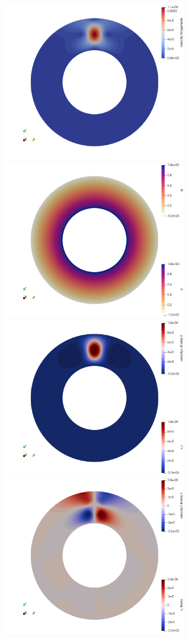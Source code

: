 \begin{center}
\includegraphics[width=8cm]{python_codes/fieldstone_152/results/exp2_axisymmetric/aspect/vel}
\includegraphics[width=8cm]{python_codes/fieldstone_152/results/exp2_axisymmetric/aspect/press}\\
\includegraphics[width=8cm]{python_codes/fieldstone_152/results/exp2_axisymmetric/aspect/vr}
\includegraphics[width=8cm]{python_codes/fieldstone_152/results/exp2_axisymmetric/aspect/vphi}\\

\end{center}
